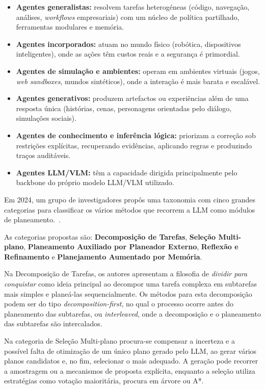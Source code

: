 \begin{itemize}
	\item \textbf{Agentes generalistas:} resolvem tarefas heterogéneas (código, navegação, análises, \textit{workflows} empresariais) com um núcleo de política partilhado, ferramentas modulares e memória.
	\item \textbf{Agentes incorporados:} atuam no mundo físico (robótica, dispositivos inteligentes), onde as ações têm custos reais e a segurança é primordial.
	\item \textbf{Agentes de simulação e ambientes:} operam em ambientes virtuais (jogos, \textit{web sandboxes}, mundos sintéticos), onde a interação é mais barata e escalável.
	\item \textbf{Agentes generativos:} produzem artefactos ou experiências além de uma resposta única (histórias, cenas, personagens orientadas pelo diálogo, simulações sociais).
	\item \textbf{Agentes de conhecimento e inferência lógica:} priorizam a correção sob restrições explícitas, recuperando evidências, aplicando regras e produzindo traços auditáveis.
	\item \textbf{Agentes LLM/VLM:} têm a capacidade dirigida principalmente pelo backbone do próprio modelo LLM/VLM utilizado.
\end{itemize}

Em 2024, um grupo de investigadores propôs uma taxonomia com cinco grandes categorias para classificar os vários métodos que recorrem a LLM como módulos de planeamento.~\cite{huang2024understanding}.

As categorias propostas são: \textbf{Decomposição de Tarefas}, \textbf{Seleção Multi-plano}, \textbf{Planeamento Auxiliado por Planeador Externo}, \textbf{Reflexão e Refinamento} e \textbf{Planejamento Aumentado por Memória}.

Na Decomposição de Tarefas, os autores apresentam a filosofia de \textit{dividir para conquistar} como ideia principal ao decompor uma tarefa complexa em subtarefas mais simples e planeá-las sequencialmente. Os métodos para esta decomposição podem ser do tipo \emph{decomposition-first}, no qual o processo ocorre antes do planeamento das subtarefas, ou \emph{interleaved}, onde a decomposição e o planeamento das subtarefas são intercalados.

Na categoria de Seleção Multi-plano procura-se compensar a incerteza e a possível falta de otimização de um único plano gerado pelo LLM, ao gerar vários planos candidatos e, no fim, selecionar o mais adequado. A geração pode recorrer a amostragem ou a mecanismos de proposta explícita, enquanto a seleção utiliza estratégias como votação maioritária, procura em árvore ou A*.

